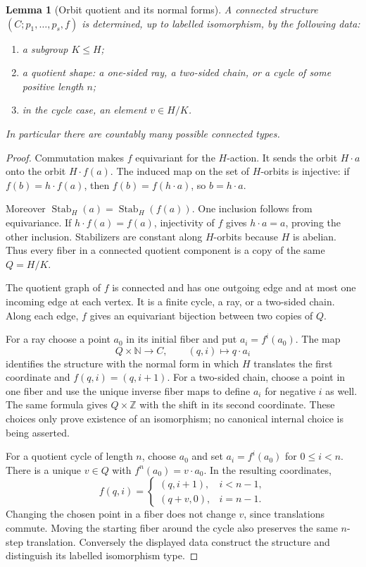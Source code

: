 \documentclass[11pt,letterpaper]{article}
\numberwithin{equation}{section}
\theoremstyle{plain}
\newtheorem{lemma}[lemma]{Lemma}
\theoremstyle{definition}
\theoremstyle{remark}
\newcommand{\NN}{\mathbb N}
\newcommand{\ZZ}{\mathbb Z}
\newcommand{\Stab}{\operatorname{Stab}}
\begin{document}
\begin{lemma}[Orbit quotient and its normal forms]\label{nee:ca:lem:mixed-normal}
A connected structure $(C;p_1,\ldots,p_s,f)$ is determined, up to labelled isomorphism, by the following data:
\begin{enumerate}[label=(\roman*)]
\item a subgroup $K\leq H$;
\item a quotient shape: a one-sided ray, a two-sided chain, or a cycle of some positive length $n$;
\item in the cycle case, an element $v\in H/K$.
\end{enumerate}
In particular there are countably many possible connected types.
\end{lemma}
\begin{proof}
Commutation makes $f$ equivariant for the $H$-action. It sends the orbit $H\cdot a$ onto the orbit $H\cdot f(a)$. The induced map on the set of $H$-orbits is injective: if $f(b)=h\cdot f(a)$, then $f(b)=f(h\cdot a)$, so $b=h\cdot a$.

Moreover $\Stab_H(a)=\Stab_H(f(a))$. One inclusion follows from equivariance. If $h\cdot f(a)=f(a)$, injectivity of $f$ gives $h\cdot a=a$, proving the other inclusion. Stabilizers are constant along $H$-orbits because $H$ is abelian. Thus every fiber in a connected quotient component is a copy of the same $Q=H/K$.

The quotient graph of $f$ is connected and has one outgoing edge and at most one incoming edge at each vertex. It is a finite cycle, a ray, or a two-sided chain. Along each edge, $f$ gives an equivariant bijection between two copies of $Q$.

For a ray choose a point $a_0$ in its initial fiber and put $a_i=f^i(a_0)$. The map
\[
Q\times\NN\longrightarrow C,\qquad(q,i)\longmapsto q\cdot a_i
\]
identifies the structure with the normal form in which $H$ translates the first coordinate and $f(q,i)=(q,i+1)$. For a two-sided chain, choose a point in one fiber and use the unique inverse fiber maps to define $a_i$ for negative $i$ as well. The same formula gives $Q\times\ZZ$ with the shift in its second coordinate. These choices only prove existence of an isomorphism; no canonical internal choice is being asserted.

For a quotient cycle of length $n$, choose $a_0$ and set $a_i=f^i(a_0)$ for $0\leq i<n$. There is a unique $v\in Q$ with $f^n(a_0)=v\cdot a_0$. In the resulting coordinates,
\begin{equation}\label{nee:ca:eq:holonomy}
f(q,i)=
\begin{cases}
(q,i+1),&i<n-1,\\
(q+v,0),&i=n-1.
\end{cases}
\end{equation}
Changing the chosen point in a fiber does not change $v$, since translations commute. Moving the starting fiber around the cycle also preserves the same $n$-step translation. Conversely the displayed data construct the structure and distinguish its labelled isomorphism type.


\end{proof}
\end{document}
